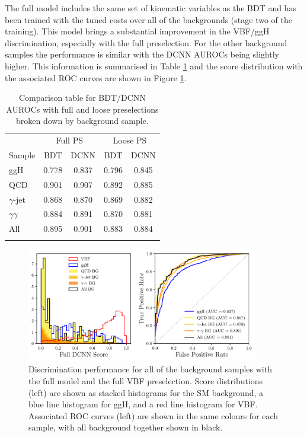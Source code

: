 The full model includes the same set of kinematic variables as the BDT and has been trained with the tuned costs over all of the backgrounds (stage two of the training).
This model brings a substantial improvement in the VBF/ggH discrimination, especially with the full preselection. 
For the other background samples the performance is similar with the DCNN AUROCs being slightly higher. 
This information is summarised in Table \ref{tab:event_categorisation:auroc_table} and the score distribution with the associated ROC curves are shown in Figure \ref{fig:event_categorisation:perf_full_DCNN}.
\begin{table}[h!]
    \centering
    \renewcommand{\arraystretch}{1.3}
    \begin{tabular}{l|cccc}
        \thickhline
        & \multicolumn{2}{c}{Full PS} & \multicolumn{2}{c}{Loose PS} \\ 
        Sample & BDT & DCNN & BDT & DCNN \\
        \hline
        ggH             & 0.778 & 0.837 & 0.796 & 0.845\\
        QCD             & 0.901 & 0.907 & 0.892 & 0.885\\
        $\gamma$-jet    & 0.868 & 0.870 & 0.869 & 0.882\\
        $\gamma\gamma$  & 0.884 & 0.891 & 0.870 & 0.881\\
        All             & 0.895 & 0.901 & 0.883 & 0.884\\
        \thickhline
    \end{tabular}
    \caption{Comparison table for BDT/DCNN AUROCs with full and loose preselections broken down by background sample.}
    \label{tab:event_categorisation:auroc_table}
\end{table}
\begin{figure}[h!]
    \centering
    \includegraphics[width=0.9\textwidth]{figures/event_selection/full_DCNN_PS.pdf}
    \caption{Discrimination performance for all of the background samples with the full model and the full VBF preselection.
             Score distributions (left) are shown as stacked histograms for the SM background, a blue line histogram for ggH, and a red line histogram for VBF. 
             Associated ROC curves (left) are shown in the same colours for each sample, with all background together shown in black.}
    \label{fig:event_categorisation:perf_full_DCNN}
\end{figure}

